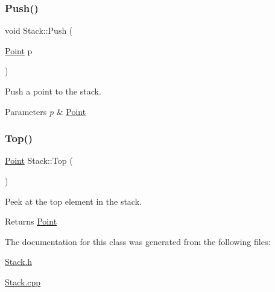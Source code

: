\subsubsection{\texorpdfstring{Push()}{Push()}}
{\footnotesize\ttfamily void Stack\+::\+Push (\begin{DoxyParamCaption}\item[{\hyperlink{classPoint}{Point}}]{p }\end{DoxyParamCaption})}



Push a point to the stack. 


\begin{DoxyParams}{Parameters}
{\em p} & \hyperlink{classPoint}{Point} \\
\hline
\end{DoxyParams}
\mbox{\label{classStack_afc15a70c319136075268f08baffb75a6}} 
\subsubsection{\texorpdfstring{Top()}{Top()}}
{\footnotesize\ttfamily \hyperlink{classPoint}{Point} Stack\+::\+Top (\begin{DoxyParamCaption}{ }\end{DoxyParamCaption})}



Peek at the top element in the stack. 

\begin{DoxyReturn}{Returns}
\hyperlink{classPoint}{Point} 
\end{DoxyReturn}


The documentation for this class was generated from the following files\+:\begin{DoxyCompactItemize}
\item 
\hyperlink{Stack_8h}{Stack.\+h}\item 
\hyperlink{Stack_8cpp}{Stack.\+cpp}\end{DoxyCompactItemize}
